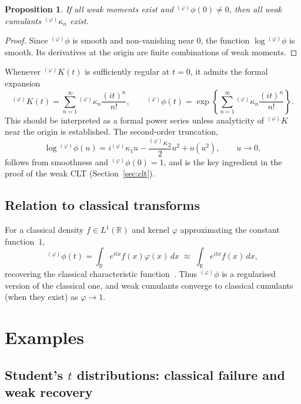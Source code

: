 \documentclass[12pt]{article}
\newtheorem{proposition}[theorem]{Proposition}
\theoremstyle{definition}
\newcommand{\R}{\mathbb{R}}
\begin{document}
\begin{proposition}\label{prop:cumulants-exist}
If all weak moments exist and ${}^{(\varphi)}\phi(0)\neq 0$, then all weak cumulants ${}^{(\varphi)}\kappa_n$ exist.
\end{proposition}

\begin{proof}
Since ${}^{(\varphi)}\phi$ is smooth and non-vanishing near $0$, the function $\log {}^{(\varphi)}\phi$ is smooth.  Its derivatives at the origin are finite combinations of weak moments.
\end{proof}

Whenever ${}^{(\varphi)}K(t)$ is sufficiently regular at $t=0$, it admits the formal expansion
\[
{}^{(\varphi)}K(t)
=
\sum_{n=1}^\infty {}^{(\varphi)}\kappa_n \frac{(it)^n}{n!},
\qquad
{}^{(\varphi)}\phi(t)
=
\exp\left\{
\sum_{n=1}^\infty {}^{(\varphi)}\kappa_n \frac{(it)^n}{n!}
\right\}.
\]
This should be interpreted as a formal power series unless analyticity of ${}^{(\varphi)}K$ near the origin is established.  The second-order truncation,
\[
\log {}^{(\varphi)}\phi(u)
=
i{}^{(\varphi)}\kappa_1 u - \frac{{}^{(\varphi)}\kappa_2}{2}u^2 + o(u^2),
\qquad u \to 0,
\]
follows from smoothness and ${}^{(\varphi)}\phi(0)=1$, and is the key ingredient in the proof of the weak CLT (Section~\ref{sec:clt}).

\subsection{Relation to classical transforms}
\label{subsec:cumulants_classical}

For a classical density $f \in L^1(\R)$ and kernel $\varphi$ approximating the constant function~$1$,
\[
{}^{(\varphi)}\phi(t)
=
\int_{\R} e^{itx} f(x)\varphi(x)\,dx
\;\approx\;
\int_{\R} e^{itx} f(x)\,dx,
\]
recovering the classical characteristic function~\cite{Lukacs1970}.  Thus ${}^{(\varphi)}\phi$ is a regularised version of the classical one, and weak cumulants converge to classical cumulants (when they exist) as $\varphi\to 1$.


\section{Examples}
\label{sec:examples}

\subsection{Student's \texorpdfstring{$t$}{t} distributions: classical failure and weak recovery}
\label{subsec:examples_t}
\end{document}
